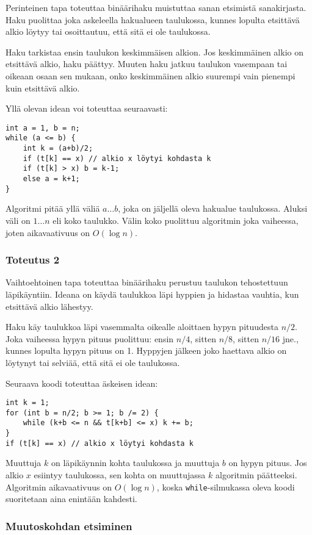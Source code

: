 Perinteinen tapa toteuttaa binäärihaku muistuttaa sanan etsimistä
sanakirjasta. Haku puolittaa joka askeleella hakualueen taulukossa,
kunnes lopulta etsittävä alkio löytyy tai osoittautuu,
että sitä ei ole taulukossa.

Haku tarkistaa ensin taulukon keskimmäisen alkion.
Jos keskimmäinen alkio on etsittävä alkio, haku päättyy.
Muuten haku jatkuu taulukon vasempaan tai oikeaan osaan sen mukaan,
onko keskimmäinen alkio suurempi vain pienempi kuin etsittävä alkio.

Yllä olevan idean voi toteuttaa seuraavasti:
\begin{lstlisting}
int a = 1, b = n;
while (a <= b) {
    int k = (a+b)/2;
    if (t[k] == x) // alkio x löytyi kohdasta k
    if (t[k] > x) b = k-1;
    else a = k+1;
}
\end{lstlisting}

Algoritmi pitää yllä väliä $a \ldots b$, joka on
jäljellä oleva hakualue taulukossa.
Aluksi väli on $1 \ldots n$ eli koko taulukko.
Välin koko puolittuu algoritmin joka vaiheessa,
joten aikavaativuus on $O(\log n)$.

\subsubsection{Toteutus 2}

Vaihtoehtoinen tapa toteuttaa binäärihaku
perustuu taulukon tehostettuun läpikäyntiin.
Ideana on käydä taulukkoa läpi hyppien
ja hidastaa vauhtia, kun etsittävä alkio lähestyy.

Haku käy taulukkoa läpi vasemmalta oikealle aloittaen
hypyn pituudesta $n/2$.
Joka vaiheessa hypyn pituus puolittuu:
ensin $n/4$, sitten $n/8$, sitten $n/16$ jne.,
kunnes lopulta hypyn pituus on 1.
Hyppyjen jälkeen joko haettava alkio on löytynyt
tai selviää, että sitä ei ole taulukossa.

Seuraava koodi toteuttaa äskeisen idean:
\begin{lstlisting}
int k = 1;
for (int b = n/2; b >= 1; b /= 2) {
    while (k+b <= n && t[k+b] <= x) k += b;
}
if (t[k] == x) // alkio x löytyi kohdasta k
\end{lstlisting}

Muuttuja $k$ on läpikäynnin kohta taulukossa
ja muuttuja $b$ on hypyn pituus.
Jos alkio $x$ esiintyy taulukossa,
sen kohta on muuttujassa $k$ algoritmin päätteeksi.
Algoritmin aikavaativuus on $O(\log n)$,
koska \texttt{while}-silmukassa oleva koodi suoritetaan
aina enintään kahdesti.

\subsubsection{Muutoskohdan etsiminen}

